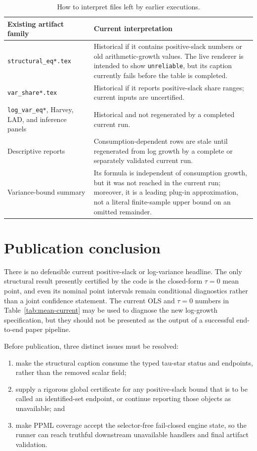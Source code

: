 \documentclass[11pt]{article}
\begin{document}
\begin{table}[ht]
\centering
\small
\begin{tabularx}{\textwidth}{@{}p{}X@{}}
\toprule
Existing artifact family & Current interpretation \\
\midrule
\texttt{structural\_eq*.tex} &
  Historical if it contains positive-slack numbers or old arithmetic-growth
  values. The live renderer is intended to show \texttt{unreliable}, but its
  caption currently fails before the table is completed. \\
\texttt{var\_share*.tex} &
  Historical if it reports positive-slack share ranges; current inputs are
  uncertified. \\
\texttt{log\_var\_eq*}, Harvey, LAD, and inference panels &
  Historical and not regenerated by a completed current run. \\
Descriptive reports &
  Consumption-dependent rows are stale until regenerated from log growth by a
  complete or separately validated current run. \\
Variance-bound summary &
  Its formula is independent of consumption growth, but it was not reached in
  the current run; moreover, it is a leading plug-in approximation, not a
  literal finite-sample upper bound on an omitted remainder. \\
\bottomrule
\end{tabularx}
\caption{How to interpret files left by earlier executions.}
\end{table}

\section{Publication conclusion}

There is no defensible current positive-slack or log-variance headline. The
only structural result presently certified by the code is the closed-form
$\tau=0$ mean point, and even its nominal point intervals remain conditional
diagnostics rather than a joint confidence statement. The current OLS and
$\tau=0$ numbers in Table~\ref{tab:mean-current} may be used to diagnose the
new log-growth specification, but they should not be presented as the output
of a successful end-to-end paper pipeline.

Before publication, three distinct issues must be resolved:

\begin{enumerate}[leftmargin=1.5em]
  \item make the structural caption consume the typed tau-star status and
    endpoints, rather than the removed scalar field;
  \item supply a rigorous global certificate for any positive-slack bound that
    is to be called an identified-set endpoint, or continue reporting those
    objects as unavailable; and
  \item make PPML coverage accept the selector-free fail-closed engine state,
    so the runner can reach truthful downstream unavailable handlers and final
    artifact validation.
\end{enumerate}
\end{document}
